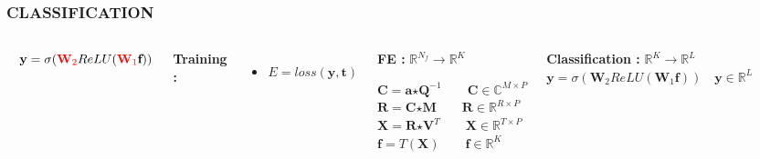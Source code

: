 \documentclass{beamer}
\begin{document}
\begin{frame}
\frametitle{CLASSIFICATION}
\begin{columns}[c]
$\quad \textbf{y} = \sigma({\color{red}\textbf{W}_{2}}ReLU({\color{red}\textbf{W}_{1}}\textbf{f}))$
\bigskip

\noindent \textbf{Training :}
\begin{itemize}
\item $E = loss(\textbf{y}, \textbf{t})$
\end{itemize}

\begin{block}{\textbf{FE :} $\mathbb{R}^{N_{f}} \rightarrow \mathbb{R}^{K}$}

$\textbf{C} = \textbf{a} \bm{\star} \textbf{Q}^{-1} \qquad \textbf{C} \in \mathbb{C}^{M \times P}$\\
$\textbf{R} = \textbf{C} \bm{\star} \textbf{M} \qquad \textbf{R} \in \mathbb{R}^{R \times P}$\\
$\textbf{X} = \textbf{R} \bm{\star} \textbf{V}^{T} \qquad \textbf{X} \in \mathbb{R}^{T \times P}$\\
$\textbf{f} = T(\textbf{X}) \qquad \textbf{f} \in \mathbb{R}^{K}$\\
\end{block}
\begin{block}{\textbf{Classification :} $\mathbb{R}^{K} \rightarrow \mathbb{R}^{L}$}
$\textbf{y} = \sigma(\textbf{W}_{2}ReLU(\textbf{W}_{1}\textbf{f})) \quad \textbf{y} \in \mathbb{R}^{L}$
\end{block}
\end{columns}
\end{frame}
\end{document}
